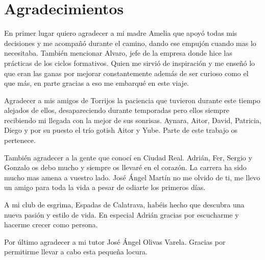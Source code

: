 \chapter{Agradecimientos}

En primer lugar quiero agradecer a mi madre Amelia que apoyó todas mis decisiones
y me acompañó durante el camino, dando ese empujón cuando mas lo necesitaba. También
mencionar Alvaro, jefe de la empresa donde hice las prácticas de los ciclos formativos. Quien me sirvió de inspiración y me enseñó lo que eran las ganas
por mejorar constantemente además de ser curioso como el que más, en parte gracias a eso me embarqué en este viaje.

Agradecer a mis amigos de Torrijos la paciencia que tuvieron durante este tiempo
alejados de ellos, desapareciendo durante temporadas pero ellos siempre recibiendo mi llegada con la mejor de sus sonrisas. Aynara, Aitor, David, Patricia, Diego y por su puesto el trío gotish Aitor y Yube. Parte de este trabajo os pertenece.

También agradecer a la gente que conocí en Ciudad Real. Adrián, Fer, Sergio y Gonzalo os debo mucho y siempre os llevaré en el corazón. La carrera ha sido mucho mas amena a vuestro lado. José Ángel Martín no me olvido de ti, me llevo un amigo para toda la vida a pesar de odiarte los primeros días.

A mi club de esgrima, Espadas de Calatrava, habéis hecho que descubra una nueva pasión y estilo de vida. En especial Adrián gracias por escucharme y hacerme crecer como persona.

Por último agradecer a mi tutor José Ángel Olivas Varela. Gracias por permitirme llevar a cabo esta pequeña locura.


